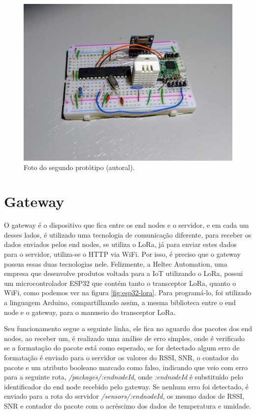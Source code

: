 \begin{figure}[H]
  \centering
  \includegraphics[width=.80\textwidth]{assets/end-node-proto-2.png} 
  \caption{Foto do segundo protótipo (autoral).}
  \label{fig:end-node-proto-2} 
\end{figure}

\section{Gateway}
\label{metod:gateway}
O gateway é o dispositivo que fica entre os end nodes e o servidor, e em cada um desses lados, é utilizado uma tecnologia de comunicação diferente, para receber os dados enviados pelos end nodes, se utiliza o LoRa, já para enviar estes dados para o servidor, utiliza-se o HTTP via WiFi. Por isso, é preciso que o gateway possua essas duas tecnologias nele. Felizmente, a Heltec Automation, uma empresa que desenvolve produtos voltada para a IoT utilizando o LoRa, possui um microcontrolador ESP32 que contém tanto o transceptor LoRa, quanto o WiFi, como podemos ver na figura \ref{fig:esp32-lora}. Para programá-lo, foi utilizado a linguagem Arduino, compartilhando assim, a mesma biblioteca entre o end node e o gateway, para o manuseio do transceptor LoRa.

Seu funcionamento segue a seguinte linha, ele fica no aguardo dos pacotes dos end nodes, ao receber um, é realizado uma análise de erro simples, onde é verificado se a formatação do pacote está como esperado, se for detectado algum erro de formatação é enviado para o servidor os valores do RSSI, SNR, o contador do pacote e um atributo booleano marcado como falso, indicando que veio com erro para a seguinte rota, \textit{/packages/:endnodeId}, onde \textit{:endnodeId} é substituído pelo identificador do end node recebido pelo gateway. Se nenhum erro foi detectado, é enviado para a rota do servidor \textit{/sensors/:endnodeId}, os mesmo dados de RSSI, SNR e contador do pacote com o acréscimo dos dados de temperatura e umidade.


